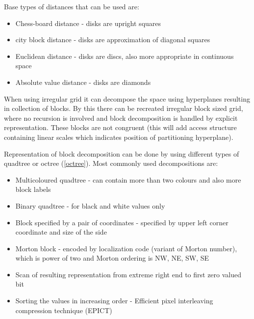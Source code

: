 Base types of distances that can be used are:
\begin{itemize}
\item Chess-board distance - disks are upright squares
\item city block distance - disks are approximation of diagonal squares
\item Euclidean distance - disks are discs, also more appropriate in continuous space
\item Absolute value distance - disks are diamonds
\end{itemize}

When using irregular grid it can decompose the space using hyperplanes resulting in collection of blocks. By this there can be recreated irregular block sized grid, where no recursion is involved and block decomposition is handled by explicit representation. These blocks are not congruent (this will add access structure containing linear scales which indicates position of partitioning hyperplane).

Representation of block decomposition can be done by using different types of quadtree or octree (\ref{octree}). Most commonly used decompositions are:
\begin{itemize}
\item Multicoloured quadtree - can contain more than two colours and also more block labels
\item Binary quadtree - for black and white values only
\item Block specified by a pair of coordinates - specified by upper left corner coordinate and size of the side
\item Morton block - encoded by localization code (variant of Morton number), which is power of two and Morton ordering is NW, NE, SW, SE
\item Scan of resulting representation from extreme right end to first zero valued bit
\item Sorting the values in increasing order - Efficient pixel interleaving compression technique (EPICT)
\end{itemize}

